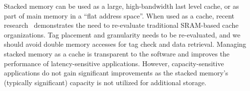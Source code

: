 
Stacked memory can be used as a large, high-bandwidth last level cache, or as part of main memory in a ``flat address space''. When used as a cache, recent research~\cite{chou-micro2014,qureshi-micro2012} demonstrates the need to re-evaluate traditional SRAM-based cache organizations. Tag placement and granularity needs to be re-evaluated, and we should avoid double memory accesses for tag 
check and data retrieval. Managing stacked memory as a cache is transparent 
to the software and improves the performance of latency-sensitive applications. However, capacity-sensitive applications do not gain significant improvements as the stacked memory's (typically significant) capacity is not utilized for additional storage.


